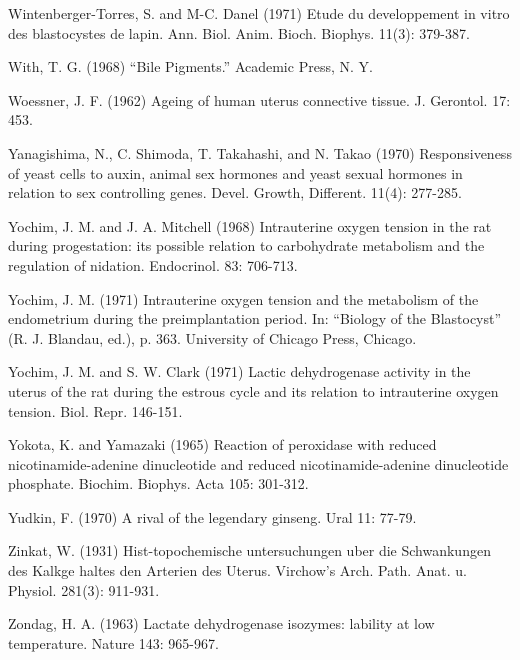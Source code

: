 Wintenberger-Torres, S. and M-C. Danel (1971) Etude du developpement in vitro des blastocystes de lapin. Ann. Biol. Anim. Bioch. Biophys. 11(3): 379-387.

With, T. G. (1968) ``Bile Pigments.'' Academic Press, N. Y.

Woessner, J. F. (1962) Ageing of human uterus connective tissue. J. Gerontol. 17: 453.

Yanagishima, N., C. Shimoda, T. Takahashi, and N. Takao (1970) Responsiveness of yeast cells to auxin, animal sex hormones and yeast sexual hormones in relation to sex controlling genes. Devel. Growth, Different. 11(4): 277-285.

Yochim, J. M. and J. A. Mitchell (1968) Intrauterine oxygen tension in the rat during progestation: its possible relation to carbohydrate metabolism and the regulation of nidation. Endocrinol. 83: 706-713.

Yochim, J. M. (1971) Intrauterine oxygen tension and the metabolism of the endometrium during the preimplantation period. In: ``Biology of the Blastocyst'' (R. J. Blandau, ed.), p. 363. University of Chicago Press, Chicago.

Yochim, J. M. and S. W. Clark (1971) Lactic dehydrogenase activity in the uterus of the rat during the estrous cycle and its relation to intrauterine oxygen tension. Biol. Repr. 146-151.

Yokota, K. and Yamazaki (1965) Reaction of peroxidase with reduced nicotinamide-adenine dinucleotide and reduced nicotinamide-adenine dinucleotide phosphate. Biochim. Biophys. Acta 105: 301-312.

Yudkin, F. (1970) A rival of the legendary ginseng. Ural 11: 77-79.

Zinkat, W. (1931) Hist-topochemische untersuchungen uber die Schwankungen des Kalkge haltes den Arterien des Uterus. Virchow's Arch. Path. Anat. u. Physiol. 281(3): 911-931.

Zondag, H. A. (1963) Lactate dehydrogenase isozymes: lability at low temperature. Nature 143: 965-967.